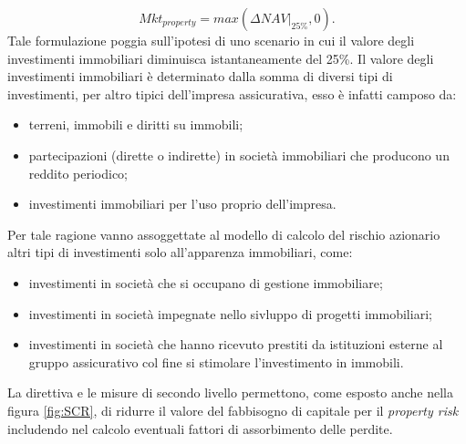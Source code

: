 \begin{equation}
Mkt_{property} = max(\Delta NAV|_{25\%},0).
\label{for:propertyrisk}
\end{equation}
Tale formulazione poggia sull'ipotesi di uno scenario in cui il valore degli investimenti immobiliari diminuisca istantaneamente del 25\%. 
Il valore degli investimenti immobiliari è determinato dalla somma di diversi tipi di investimenti, per altro tipici dell'impresa assicurativa, esso è infatti camposo da:
\begin{itemize}
\item terreni, immobili e diritti su immobili;
\item partecipazioni (dirette o indirette) in società immobiliari che producono un reddito periodico;
\item investimenti immobiliari per l'uso proprio dell'impresa.
\end{itemize}
Per tale ragione vanno assoggettate al modello di calcolo del rischio azionario altri tipi di investimenti solo all'apparenza immobiliari, come:
\begin{itemize}
\item investimenti in società che si occupano di gestione immobiliare;
\item investimenti in società impegnate nello sivluppo di progetti immobiliari;
\item investimenti in società che hanno ricevuto prestiti da istituzioni esterne al gruppo assicurativo col fine si stimolare l'investimento in immobili.
\end{itemize}
La direttiva e le misure di secondo livello permettono, come esposto anche nella figura \ref{fig:SCR}, di ridurre il valore del fabbisogno di capitale per il {\itshape property risk} includendo nel calcolo eventuali fattori di assorbimento delle perdite.

